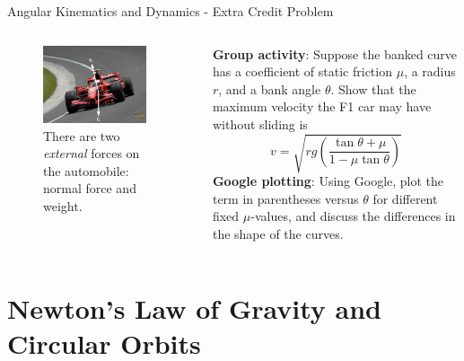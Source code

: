 \documentclass{beamer}
\begin{document}
\begin{frame}{Angular Kinematics and Dynamics - Extra Credit Problem}
\begin{columns}[T]
\begin{column}{0.5\textwidth}
\begin{figure}
\centering
\includegraphics[width=0.9\textwidth]{figures/ferari.pdf}
\caption{\label{fig:ferari2} There are two \alert{\textit{external}} forces on the automobile: normal force and weight.}
\end{figure}
\end{column}
\begin{column}{0.5\textwidth}
\small
\textbf{Group activity}: Suppose the banked curve has a coefficient of static friction $\mu$, a radius $r$, and a bank angle $\theta$.  Show that the maximum velocity the F1 car may have without sliding is 
\begin{equation}
v = \sqrt{rg\left(\frac{\tan\theta+\mu}{1-\mu\tan\theta}\right)}
\end{equation}
\textbf{Google plotting}: Using Google, plot the term in parentheses versus $\theta$ for different fixed $\mu$-values, and discuss the differences in the shape of the curves.
\end{column}
\end{columns}
\end{frame}

\section{Newton's Law of Gravity and Circular Orbits}
\end{document}
